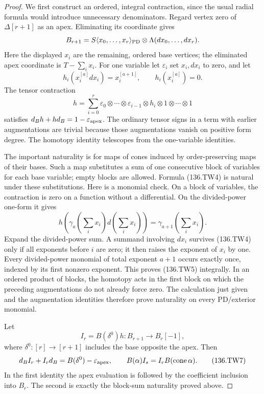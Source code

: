 \begin{proof}
We first construct an ordered, integral contraction,
since the usual radial formula would introduce unnecessary
denominators. Regard vertex zero of $\Delta[r+1]$ as an apex.
Eliminating its coordinate gives
\[
 B_{r+1}=S\langle x_0,\ldots,x_r\rangle_{\rm PD}
                                \otimes\Lambda(dx_0,\ldots,dx_r).
\]
Here the displayed $x_i$ are the remaining, ordered base
vertices; the eliminated apex coordinate is $T-\sum_i x_i$.
For one variable let $\varepsilon_i$ set $x_i,dx_i$ to zero,
and let
\[
 h_i(x_i^{[a]}dx_i)=x_i^{[a+1]},\qquad h_i(x_i^{[a]})=0.
\]
The tensor contraction
\[
 h=\sum_{i=0}^r
       \varepsilon_0\otimes\cdots\otimes\varepsilon_{i-1}
                      \otimes h_i\otimes1\otimes\cdots\otimes1
                                                               \tag{136.TW4}
\]
satisfies $d_Bh+hd_B=1-\varepsilon_{\rm apex}$. The
ordinary tensor signs in a term with earlier augmentations
are trivial because those augmentations vanish on positive
form degree. The homotopy identity telescopes from the
one-variable identities.

The important naturality is for maps of cones induced
by order-preserving maps of their bases. Such a map
substitutes a sum of one consecutive block of variables
for each base variable; empty blocks are allowed.
Formula (136.TW4) is natural under these substitutions.
Here is a monomial check. On a block of variables, the
contraction is zero on a function without a differential.
On the divided-power one-form it gives
\[
 h\left(\gamma_a(\textstyle\sum_i x_i)
                          d(\textstyle\sum_i x_i)\right)
                   =\gamma_{a+1}(\textstyle\sum_i x_i).
                                                               \tag{136.TW5}
\]
Expand the divided-power sum. A summand involving $dx_i$
survives (136.TW4) only if all exponents before $i$ are
zero; it then raises the exponent of $x_i$ by one.
Every divided-power monomial of total exponent $a+1$
occurs exactly once, indexed by its first nonzero exponent.
This proves (136.TW5) integrally. In an ordered product
of blocks, the homotopy acts in the first block on which
the preceding augmentations do not already force zero.
The calculation just given and the augmentation identities
therefore prove naturality on every PD/exterior monomial.

Let
\[
 I_r=B(\delta^0)h:B_{r+1}\longrightarrow B_r[-1],
                                                               \tag{136.TW6}
\]
where $\delta^0:[r]\to[r+1]$ includes the base opposite
the apex. Then
\[
 d_BI_r+I_rd_B=B(\delta^0)-\varepsilon_{\rm apex},
 \qquad
 B(\alpha)I_s=I_r B(\operatorname{cone}\alpha).
                                                               \tag{136.TW7}
\]
In the first identity the apex evaluation is followed
by the coefficient inclusion into $B_r$. The second
is exactly the block-sum naturality proved above.


\end{proof}
